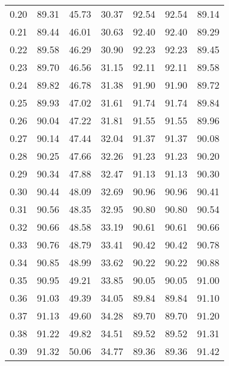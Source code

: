 \begin{tabular}{|c|c|c|c|c|c|c|}
      0.20 &     89.31 &     45.73 &      30.37 &   92.54 &      92.54 &         89.14 \\
      0.21 &     89.44 &     46.01 &      30.63 &   92.40 &      92.40 &         89.29 \\
      0.22 &     89.58 &     46.29 &      30.90 &   92.23 &      92.23 &         89.45 \\
      0.23 &     89.70 &     46.56 &      31.15 &   92.11 &      92.11 &         89.58 \\
      0.24 &     89.82 &     46.78 &      31.38 &   91.90 &      91.90 &         89.72 \\
      0.25 &     89.93 &     47.02 &      31.61 &   91.74 &      91.74 &         89.84 \\
      0.26 &     90.04 &     47.22 &      31.81 &   91.55 &      91.55 &         89.96 \\
      0.27 &     90.14 &     47.44 &      32.04 &   91.37 &      91.37 &         90.08 \\
      0.28 &     90.25 &     47.66 &      32.26 &   91.23 &      91.23 &         90.20 \\
      0.29 &     90.34 &     47.88 &      32.47 &   91.13 &      91.13 &         90.30 \\
      0.30 &     90.44 &     48.09 &      32.69 &   90.96 &      90.96 &         90.41 \\
      0.31 &     90.56 &     48.35 &      32.95 &   90.80 &      90.80 &         90.54 \\
      0.32 &     90.66 &     48.58 &      33.19 &   90.61 &      90.61 &         90.66 \\
      0.33 &     90.76 &     48.79 &      33.41 &   90.42 &      90.42 &         90.78 \\
      0.34 &     90.85 &     48.99 &      33.62 &   90.22 &      90.22 &         90.88 \\
      0.35 &     90.95 &     49.21 &      33.85 &   90.05 &      90.05 &         91.00 \\
      0.36 &     91.03 &     49.39 &      34.05 &   89.84 &      89.84 &         91.10 \\
      0.37 &     91.13 &     49.60 &      34.28 &   89.70 &      89.70 &         91.20 \\
      0.38 &     91.22 &     49.82 &      34.51 &   89.52 &      89.52 &         91.31 \\
      0.39 &     91.32 &     50.06 &      34.77 &   89.36 &      89.36 &         91.42 \\

\end{tabular}

